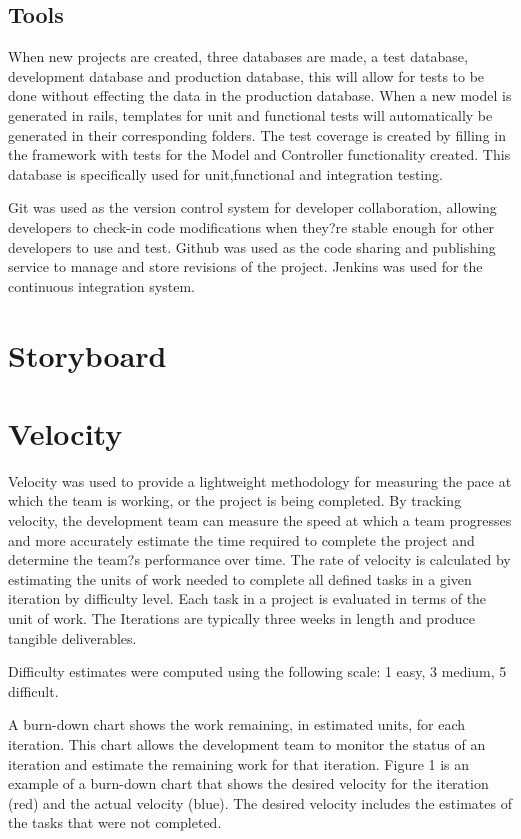 \documentclass[12pt]{elsarticle}
\begin{document}
\subsection{Tools}
When new projects are created, three databases are made, a test database, development database and production database, this will allow for tests to be done without effecting the data in the production database. When a new model is generated in rails, templates for unit and functional tests will automatically be generated in their corresponding folders. The test coverage is created by filling in the framework with tests for the Model and Controller functionality created. This database is specifically used for unit,functional and integration testing.

Git was used as the version control system for developer collaboration, allowing developers to check-in code modifications when they?re stable enough for other developers to use and test. Github was used as the code sharing and publishing service to manage and store revisions of the project. Jenkins was used for the continuous integration system. 
\section{Storyboard}
\section{Velocity}
Velocity was used to provide a lightweight methodology for measuring the pace at which the team is working, or the project is being completed. By tracking velocity, the development team can measure the speed at which a team progresses and more accurately estimate the time required to complete the project and determine the team?s performance over time. The rate of velocity is calculated by estimating the units of work needed to complete all defined tasks in a given iteration by difficulty level. Each task in a project is evaluated in terms of the unit of work. The Iterations are typically three weeks in length and produce tangible deliverables.

Difficulty estimates were computed using the following scale: 1 easy, 3 medium, 5 difficult.

A burn-down chart shows the work remaining, in estimated units, for each iteration. This chart allows the development team to monitor the status of an iteration and estimate the remaining work for that iteration. Figure 1 is an example of a burn-down chart that shows the desired velocity for the iteration (red) and the actual velocity (blue). The desired velocity includes the estimates of the tasks that were not completed.
\end{document}
